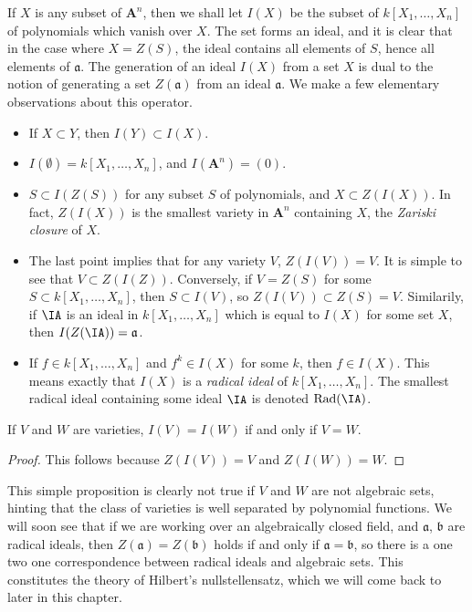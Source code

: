If $X$ is any subset of $\mathbf{A}^n$, then we shall let $I(X)$ be the subset of $k[X_1, \dots, X_n]$ of polynomials which vanish over $X$. The set forms an ideal, and it is clear that in the case where $X = Z(S)$, the ideal contains all elements of $S$, hence all elements of $\mathfrak{a}$. The generation of an ideal $I(X)$ from a set $X$ is dual to the notion of generating a set $Z(\mathfrak{a})$ from an ideal $\mathfrak{a}$. We make a few elementary observations about this operator.
%
\begin{itemize}
    \item If $X \subset Y$, then $I(Y) \subset I(X)$.
    \item $I(\emptyset) = k[X_1, \dots, X_n]$, and $I(\mathbf{A}^n) = (0)$.
    \item $S \subset I(Z(S))$ for any subset $S$ of polynomials, and $X \subset Z(I(X))$. In fact, $Z(I(X))$ is the smallest variety in $\mathbf{A}^n$ containing $X$, the \emph{Zariski closure} of $X$.
    \item The last point implies that for any variety $V$, $Z(I(V)) = V$. It is simple to see that $V \subset Z(I(Z))$. Conversely, if $V = Z(S)$ for some $S \subset k[X_1,\dots,X_n]$, then $S \subset I(V)$, so $Z(I(V)) \subset Z(S) = V$. Similarily, if $\IA$ is an ideal in $k[X_1,\dots,X_n]$ which is equal to $I(X)$ for some set $X$, then $I(Z(\IA)) = \mathfrak{a}$.
    \item If $f \in k[X_1,\dots,X_n]$ and $f^k \in I(X)$ for some $k$, then $f \in I(X)$. This means exactly that $I(X)$ is a \emph{radical ideal} of $k[X_1,\dots,X_n]$. The smallest radical ideal containing some ideal $\IA$ is denoted $\text{Rad}(\IA)$.
\end{itemize}

\begin{prop}
    If $V$ and $W$ are varieties, $I(V) = I(W)$ if and only if $V = W$.
\end{prop}
\begin{proof}
    This follows because $Z(I(V)) = V$ and $Z(I(W)) = W$.
\end{proof}

This simple proposition is clearly not true if $V$ and $W$ are not algebraic sets, hinting that the class of varieties is well separated by polynomial functions. We will soon see that if we are working over an algebraically closed field, and $\mathfrak{a}$, $\mathfrak{b}$ are radical ideals, then $Z(\mathfrak{a}) = Z(\mathfrak{b})$ holds if and only if $\mathfrak{a} = \mathfrak{b}$, so there is a one two one correspondence between radical ideals and algebraic sets. This constitutes the theory of Hilbert's nullstellensatz, which we will come back to later in this chapter.

